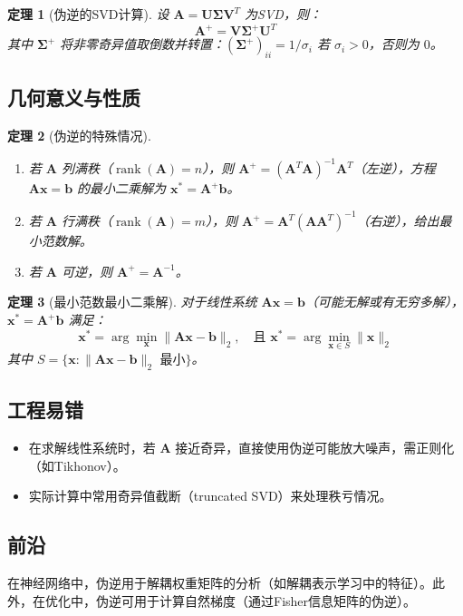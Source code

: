 \documentclass[UTF8, 10pt]{ctexart}
\newtheorem{theorem}{定理}[section]
\newcommand{\rank}{\operatorname{rank}}
\begin{document}
\begin{theorem}[伪逆的SVD计算]
设 $\bm{A} = \bm{U} \bm{\Sigma} \bm{V}^T$ 为SVD，则：
\[
\bm{A}^+ = \bm{V} \bm{\Sigma}^+ \bm{U}^T
\]
其中 $\bm{\Sigma}^+$ 将非零奇异值取倒数并转置：$(\bm{\Sigma}^+)_{ii} = 1/\sigma_i$ 若 $\sigma_i > 0$，否则为 $0$。
\end{theorem}

\subsection{几何意义与性质}
\begin{theorem}[伪逆的特殊情况]
\begin{enumerate}
    \item 若 $\bm{A}$ 列满秩（$\rank(\bm{A}) = n$），则 $\bm{A}^+ = (\bm{A}^T\bm{A})^{-1}\bm{A}^T$（左逆），方程 $\bm{A}\bm{x} = \bm{b}$ 的最小二乘解为 $\bm{x}^* = \bm{A}^+\bm{b}$。
    \item 若 $\bm{A}$ 行满秩（$\rank(\bm{A}) = m$），则 $\bm{A}^+ = \bm{A}^T(\bm{A}\bm{A}^T)^{-1}$（右逆），给出最小范数解。
    \item 若 $\bm{A}$ 可逆，则 $\bm{A}^+ = \bm{A}^{-1}$。
\end{enumerate}
\end{theorem}

\begin{theorem}[最小范数最小二乘解]
对于线性系统 $\bm{A}\bm{x} = \bm{b}$（可能无解或有无穷多解），$\bm{x}^* = \bm{A}^+ \bm{b}$ 满足：
\[
\bm{x}^* = \arg\min_{\bm{x}} \|\bm{A}\bm{x} - \bm{b}\|_2, \quad \text{且 } \bm{x}^* = \arg\min_{\bm{x} \in S} \|\bm{x}\|_2
\]
其中 $S = \{\bm{x} : \|\bm{A}\bm{x} - \bm{b}\|_2 \text{ 最小}\}$。
\end{theorem}

\subsection{工程易错}
\begin{itemize}
    \item 在求解线性系统时，若 $\bm{A}$ 接近奇异，直接使用伪逆可能放大噪声，需正则化（如Tikhonov）。
    \item 实际计算中常用奇异值截断（truncated SVD）来处理秩亏情况。
\end{itemize}

\subsection{前沿}
在神经网络中，伪逆用于解耦权重矩阵的分析（如解耦表示学习中的特征）。此外，在优化中，伪逆可用于计算自然梯度（通过Fisher信息矩阵的伪逆）。
\end{document}
